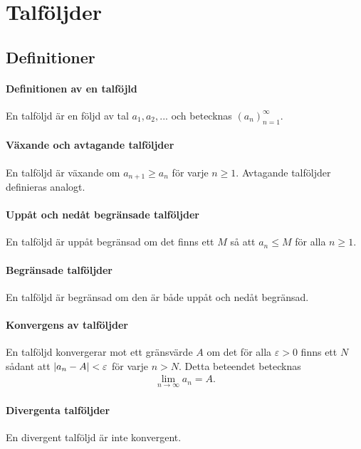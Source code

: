 \section{Talföljder}

\subsection{Definitioner}

\paragraph{Definitionen av en talföjld}
En talföljd är en följd av tal $a_1, a_2, ...$ och betecknas $\left(a_n\right)_{n = 1}^\infty$.

\paragraph{Växande och avtagande talföljder}
En talföljd är växande om $a_{n + 1} \geq a_n$ för varje $n \geq 1$. Avtagande talföljder definieras analogt.

\paragraph{Uppåt och nedåt begränsade talföljder}
En talföljd är uppåt begränsad om det finns ett $M$ så att $a_n \leq M$ för alla $n \geq 1$.

\paragraph{Begränsade talföljder}
En talföljd är begränsad om den är både uppåt och nedåt begränsad.

\paragraph{Konvergens av talföljder}
En talföljd konvergerar mot ett gränsvärde $A$ om det för alla $\varepsilon > 0$ finns ett $N$ sådant att $\abs{a_n - A} < \varepsilon$ för varje $n > N$. Detta beteendet betecknas
\begin{align*}
	\lim_{n\to\infty} a_n = A.
\end{align*}

\paragraph{Divergenta talföljder}
En divergent talföljd är inte konvergent.

